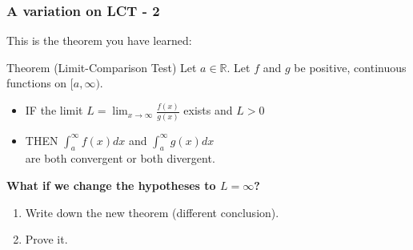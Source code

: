 \documentclass[14pt]{beamer}
\begin{document}
	\begin{frame}[t]
		\fontsize{12}{12}\selectfont
		\frametitle{A variation on LCT - 2}

		This is the theorem you have learned:
		\begin{block}{\fontsize{13}{13}\selectfont Theorem (Limit-Comparison Test)}
			Let $\displaystyle a \in \mathbb{R}$. Let $f$ and $g$ be positive, continuous
			functions on $\displaystyle [a, \infty)$.
			\begin{itemize}
				\item IF the limit \; $\displaystyle L = \lim_{x \to \infty}\frac{f(x)}{g(x)}$
					\; exists and \; $\displaystyle L>0$

				\item THEN $\displaystyle \int_{a}^{\infty}\! \! f(x) dx$ \; and \; $\displaystyle
					\int_{a}^{\infty}\! \! g(x) dx$ \\ are both convergent or both divergent.
			\end{itemize}
		\end{block}

		\vspace{.2cm}
		{\bfseries What if we change the hypotheses to $L=\infty$?}
		\begin{enumerate}
			\item Write down the new theorem (different conclusion).

			\item Prove it.
		\end{enumerate}
	\end{frame}
\end{document}
